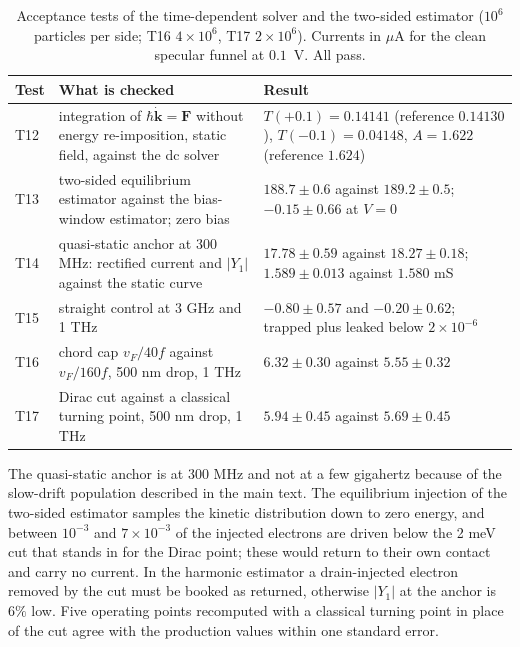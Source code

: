 \documentclass[aps,prapplied,onecolumn,superscriptaddress,floatfix]{revtex4-2}
\newcommand{\vF}{v_{F}}
\begin{document}
\begin{table}[ht]
\caption{Acceptance tests of the time-dependent solver and the two-sided
estimator ($10^{6}$ particles per side; T16 $4\times10^{6}$, T17
$2\times10^{6}$). Currents in $\mu$A for the clean specular funnel at
$0.1$~V. All pass.}
\begin{ruledtabular}
\begin{tabular}{lp{}p{}}
Test & What is checked & Result \\
\hline
T12 & integration of $\hbar\dot{\bm k}=\bm F$ without energy re-imposition, static field, against the dc solver & $T(+0.1)=0.14141$ (reference $0.14130$), $T(-0.1)=0.04148$, $A=1.622$ (reference $1.624$) \\
T13 & two-sided equilibrium estimator against the bias-window estimator; zero bias & $188.7\pm0.6$ against $189.2\pm0.5$; $-0.15\pm0.66$ at $V=0$ \\
T14 & quasi-static anchor at 300 MHz: rectified current and $|Y_{1}|$ against the static curve & $17.78\pm0.59$ against $18.27\pm0.18$; $1.589\pm0.013$ against $1.580$ mS \\
T15 & straight control at 3 GHz and 1 THz & $-0.80\pm0.57$ and $-0.20\pm0.62$; trapped plus leaked below $2\times10^{-6}$ \\
T16 & chord cap $\vF/40f$ against $\vF/160f$, 500 nm drop, 1 THz & $6.32\pm0.30$ against $5.55\pm0.32$ \\
T17 & Dirac cut against a classical turning point, 500 nm drop, 1 THz & $5.94\pm0.45$ against $5.69\pm0.45$ \\
\end{tabular}
\end{ruledtabular}
\end{table}

The quasi-static anchor is at 300 MHz and not at a few gigahertz because of
the slow-drift population described in the main text. The equilibrium
injection of the two-sided estimator samples the kinetic distribution down
to zero energy, and between $10^{-3}$ and $7\times10^{-3}$ of the injected
electrons are driven below the 2 meV cut that stands in for the Dirac
point; these would return to their own contact and carry no current. In the
harmonic estimator a drain-injected electron removed by the cut must be
booked as returned, otherwise $|Y_{1}|$ at the anchor is $6\%$ low. Five
operating points recomputed with a classical turning point in place of the
cut agree with the production values within one standard error.
\end{document}
